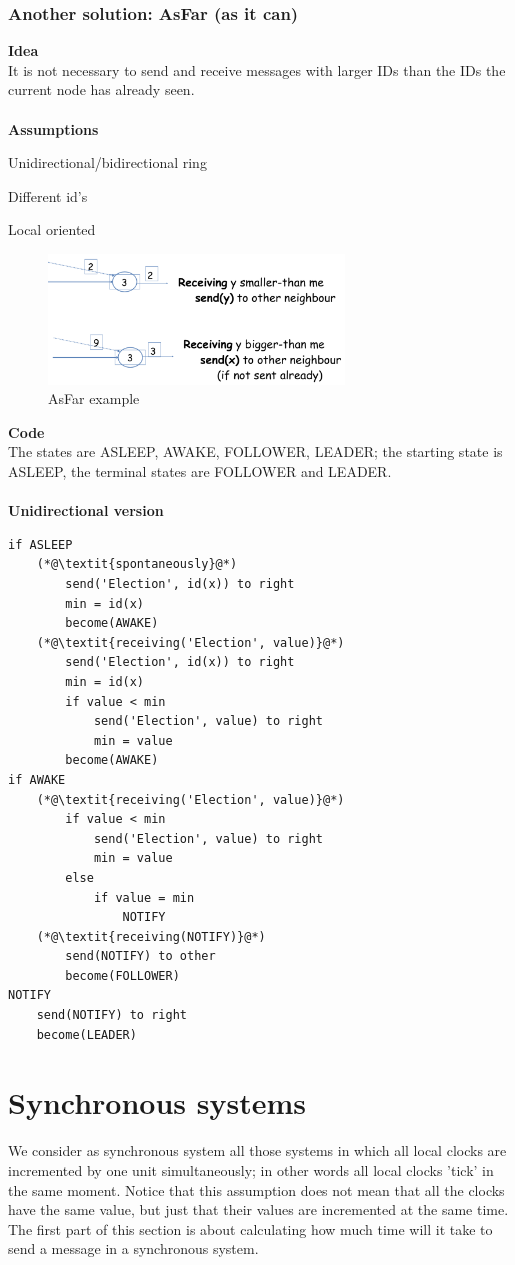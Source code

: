 \documentclass[paper=a4, fontsize=11pt]{scrartcl} %
\numberwithin{equation}{section} %
\numberwithin{figure}{section} %
\numberwithin{table}{section} %
\begin{document}
\subsubsection*{Another solution: AsFar (as it can)}
\textbf{Idea} \\ It is not necessary to send and receive messages with larger IDs than the IDs the current node has already seen.\\
~ \\ \textbf{Assumptions}
\begin{compactitem}
\item Unidirectional/bidirectional ring
\item Different id's
\item Local oriented
\end{compactitem}
\begin{figure}[H]
  \centering
  \includegraphics[width=0.7\textwidth]{img/asfar.png}
  \caption{AsFar example}
  \label{fig:boat1}
\end{figure}
\textbf{Code} \\The states are ASLEEP, AWAKE, FOLLOWER, LEADER; the starting state is ASLEEP, the terminal states are FOLLOWER and LEADER.\\ \\
\textbf{Unidirectional version}
\begin{lstlisting}
if ASLEEP
	(*@\textit{spontaneously}@*)
		send('Election', id(x)) to right
		min = id(x)
		become(AWAKE)
	(*@\textit{receiving('Election', value)}@*)
		send('Election', id(x)) to right
		min = id(x)
		if value < min
			send('Election', value) to right
			min = value
		become(AWAKE)		
if AWAKE
	(*@\textit{receiving('Election', value)}@*)
		if value < min
			send('Election', value) to right
			min = value
		else
			if value = min
				NOTIFY
	(*@\textit{receiving(NOTIFY)}@*)
		send(NOTIFY) to other
		become(FOLLOWER)
NOTIFY
	send(NOTIFY) to right
	become(LEADER)						
\end{lstlisting}


\section*{Synchronous systems}
We consider as synchronous system all those systems in which all local clocks are incremented by one unit simultaneously; in other words all local clocks 'tick' in the same moment. Notice that this assumption does not mean that all the clocks have the same value, but just that their values are incremented at the same time.\\ 
The first part of this section is about calculating how much time will it take to send a message in a synchronous system.
\end{document}

